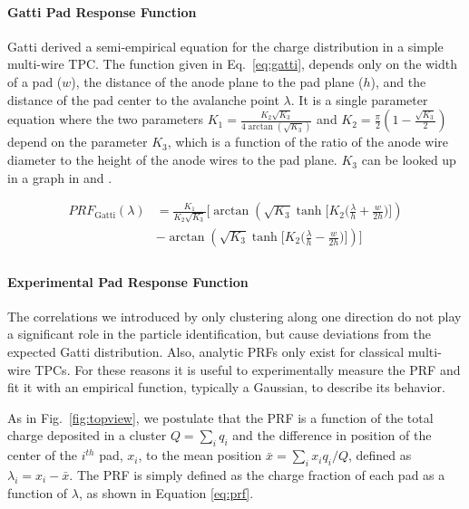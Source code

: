 \documentclass[review]{elsarticle}
\begin{document}
\paragraph{Gatti Pad Response Function}
Gatti \cite{gatti} derived a semi-empirical equation for the charge distribution in a simple multi-wire TPC. The function given in Eq.~\ref{eq:gatti}, depends only on the width of a pad ($w$), the distance of the anode plane to the pad plane ($h$), and the distance of the pad center to the avalanche point $\lambda$. It is a single parameter equation where the two parameters $K_1 = \frac{K_{2}\sqrt{K_3}}{4 \arctan(\sqrt{K_3})}$ and $K_2 = \frac{\pi}{2}\left(1-\frac{\sqrt{K_{3}}}{2}\right)$ depend on the parameter $K_3$, which is a function of the ratio of the anode wire diameter to the height of the anode wires to the pad plane. $K_3$ can be looked up in a graph in \cite{blumrol} and \citep{gatti}.

\begin{equation}\label{eq:gatti}
\begin{split}
PRF_{\mathrm{Gatti}}(\lambda)
& = \frac{K_{1}}{K_{2}\sqrt{K_{3}}}\bigl[\arctan(\sqrt{K_{3}}\tanh\bigl[K_{2}\bigl(\frac{\lambda}{h}+\frac{w}{2h}\bigr)\bigr]) \\
& - \arctan(\sqrt{K_{3}}\tanh\bigl[K_{2}\bigl(\frac{\lambda}{h}-\frac{w}{2h}\bigr)\bigr])\bigr] \\
\end{split}
\end{equation}

\paragraph{Experimental Pad Response Function}

The correlations we introduced by only clustering along one direction do not play a significant role in the particle identification, but cause deviations from the expected Gatti distribution. Also, analytic PRFs only exist for classical multi-wire TPCs. For these reasons it is useful to experimentally measure the PRF and fit it with an empirical function, typically a Gaussian, to describe its behavior. 

As in Fig.~\ref{fig:topview}, we postulate that the PRF is a function of the total charge deposited in a cluster $Q = \sum_i q_i$ and the difference in position of the center of the $i^{th}$ pad, $x_i$, to the mean position $\bar{x} = \sum_i x_i q_i/Q$, defined as $\lambda_i = x_i-\bar{x}$. The PRF is simply defined as the charge fraction of each pad as a function of $\lambda$, as shown in Equation \ref{eq:prf}. 
\end{document}

